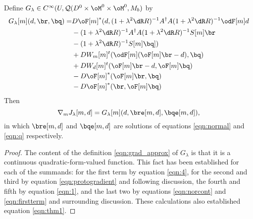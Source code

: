 \begin{thm} Define $G_{\lambda} \in C^{\infty}(U, {\cal
  Q}(D^0 \times \oM^0 \times \oM^0, M_b)$ by
\begin{equation}
\label{eqn:grad_approx}
\begin{split}
G_{\lambda}[m](d,\br,\bq) = 
& D\oF[m]^*(d,(1+\lambda^2\dR R)^{-1}A^{\dagger}A (1+\lambda^2 \dR R)^{-1}\odF[m]d \\
& - (1+\lambda^2\dR R)^{-1}A^{\dagger}A (1+\lambda^2 \dR R)^{-1} S[m]\br\\
& - (1+\lambda^2\dR R)^{-1}S[m]\bq]) \\
& + DW_m[m]^t(\odF[m](\oF[m]\br-d),\bq)\\
&+ DW_d[m]^t(\oF[m]\br-d,\oF[m]\bq)\\
&- D\oF[m]^*(\oF[m]\br,\bq) \\
& -D\oF[m]^*(\br,\oF[m]\bq)
\end{split}
\end{equation}
Then
\begin{equation}
\label{eqn:thm1}
\nabla_m J_{\lambda}[m,d] = G_{\lambda}[m](d,\bre[m,d],\bqe[m,d]),
\end{equation}
in which $\bre[m,d]$ and $\bqe[m,d]$ are solutions of equations \ref{eqn:normal} and
\ref{eqn:q} respectively.
\end{thm}

\begin{proof} The content of the definition \ref{eqn:grad_approx} of
  $G_{\lambda}$ is that it is a continuous quadratic-form-valued
  function. This fact has been established for each of the summands:
  for the first term by equation \ref{eqn:4}, for the second and third
  by equation \ref{eqn:protogradient} and following discussion, the
  fourth and fifth by equation \ref{eqn:1}, and the last two by
  equations \ref{eqn:norcont} and \ref{eqn:firstterm} and surrounding
  discussion. These calculations also established equation
  \ref{eqn:thm1}.
\end{proof}

